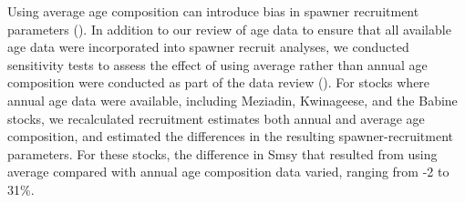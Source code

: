 \documentclass[french,11pt]{book}
\begin{document}
Using average age composition can introduce bias in spawner recruitment parameters (). In addition to our review of age data to ensure that all available age data were incorporated into spawner recruit analyses, we conducted sensitivity tests to assess the effect of using average rather than annual age composition were conducted as part of the data review (). For stocks where annual age data were available, including Meziadin, Kwinageese, and the Babine stocks, we recalculated recruitment estimates both annual and average age composition, and estimated the differences in the resulting spawner-recruitment parameters. For these stocks, the difference in Smsy that resulted from using average compared with annual age composition data varied, ranging from -2 to 31\%.

\clearpage
\end{document}
